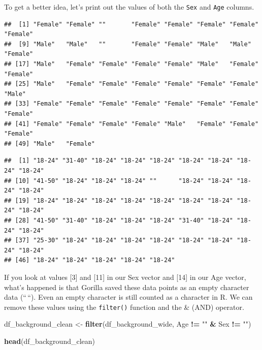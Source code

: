 \documentclass[
]{book}
\newenvironment{Shaded}{\begin{snugshade}}{\end{snugshade}}
\newcommand{\FunctionTok}[1]{\textcolor[rgb]{0.13,0.29,0.53}{\textbf{#1}}}
\newcommand{\NormalTok}[1]{#1}
\newcommand{\OtherTok}[1]{\textcolor[rgb]{0.56,0.35,0.01}{#1}}
\newcommand{\SpecialCharTok}[1]{\textcolor[rgb]{0.81,0.36,0.00}{\textbf{#1}}}
\newcommand{\StringTok}[1]{\textcolor[rgb]{0.31,0.60,0.02}{#1}}
\begin{document}
To get a better idea, let's print out the values of both the \texttt{Sex} and \texttt{Age} columns.

\begin{Shaded}
\end{Shaded}

\begin{verbatim}
##  [1] "Female" "Female" ""       "Female" "Female" "Female" "Female" "Female"
##  [9] "Male"   "Male"   ""       "Female" "Female" "Male"   "Male"   "Female"
## [17] "Male"   "Female" "Female" "Female" "Female" "Male"   "Female" "Female"
## [25] "Male"   "Female" "Female" "Female" "Female" "Female" "Female" "Male"  
## [33] "Female" "Female" "Female" "Female" "Female" "Female" "Female" "Female"
## [41] "Female" "Female" "Female" "Female" "Male"   "Female" "Female" "Female"
## [49] "Male"   "Female"
\end{verbatim}

\begin{Shaded}
\end{Shaded}

\begin{verbatim}
##  [1] "18-24" "31-40" "18-24" "18-24" "18-24" "18-24" "18-24" "18-24" "18-24"
## [10] "41-50" "18-24" "18-24" "18-24" ""      "18-24" "18-24" "18-24" "18-24"
## [19] "18-24" "18-24" "18-24" "18-24" "18-24" "18-24" "18-24" "18-24" "18-24"
## [28] "41-50" "31-40" "18-24" "18-24" "18-24" "31-40" "18-24" "18-24" "18-24"
## [37] "25-30" "18-24" "18-24" "18-24" "18-24" "18-24" "18-24" "18-24" "18-24"
## [46] "18-24" "18-24" "18-24" "18-24" "18-24"
\end{verbatim}

If you look at values {[}3{]} and {[}11{]} in our Sex vector and {[}14{]} in our Age vector, what's happened is that Gorilla saved these data points as an empty character data (``\,``). Even an empty character is still counted as a character in R. We can remove these values using the \texttt{filter()} function and the \& (AND) operator.

\begin{Shaded}
\begin{Highlighting}[]
\NormalTok{df\_background\_clean }\OtherTok{\textless{}{-}} \FunctionTok{filter}\NormalTok{(df\_background\_wide, Age }\SpecialCharTok{!=} \StringTok{""} \SpecialCharTok{\&}\NormalTok{ Sex }\SpecialCharTok{!=} \StringTok{""}\NormalTok{)}

\FunctionTok{head}\NormalTok{(df\_background\_clean)}
\end{Highlighting}
\end{Shaded}
\end{document}
